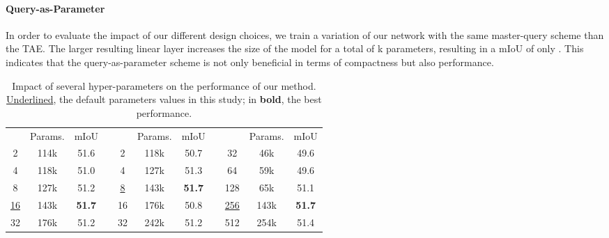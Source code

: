 \documentclass[runningheads]{llncs}
\begin{document}
\paragraph{Query-as-Parameter}
In order to evaluate the impact of our different design choices, we train a variation of our network with the same master-query scheme than the TAE. The larger resulting linear layer increases the size of the model for a total of k parameters, resulting in a mIoU of only . This indicates that the query-as-parameter scheme is not only beneficial in terms of compactness but also performance.
\begin{table}[h]
    \caption{Impact of several hyper-parameters on the performance of our method. \underline{Underlined}, the default parameters values in this study; in \textbf{bold}, the best performance.}
    \centering
    \begin{tabular}{ccccccccccc}
 & Params.  & mIoU & \phantom{abc} &  & Params.  & mIoU & \phantom{abc} & & Params.  & mIoU \\ \cmidrule{1-3} \cmidrule{5-7} \cmidrule{9-11}
     2  &  114k   &  51.6    &&      2   &     118k   &     50.7      &&  32    & 46k     &     49.6     \\
     4  &      118k   &  51.0  & & 4   &   127k     &     51.3      &&    64   &   59k   &      49.6     \\
      8&    127k  &    51.2  && \underline{8}  &   143k   &     \bf51.7     &&   128    &  65k  &      51.1     \\
    \underline{16} &    143k &   \bf51.7    && 16  &    176k    &    50.8       &&  \underline{256}     &   143k   &      \bf51.7     \\

      32 &   176k  &   51.2   &&       32  &     242k   &     51.2      &&   512    &   254k  &      51.4     \\\cmidrule{1-3} \cmidrule{5-7} \cmidrule{9-11}
    \end{tabular}
    \label{tab:ablations}
\end{table}
\end{document}
